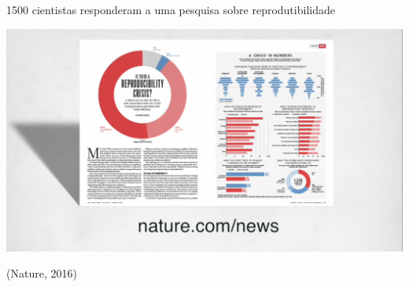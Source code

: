 \documentclass{beamer}
\begin{document}
\begin{frame}
  1500 cientistas responderam a uma pesquisa sobre reprodutibilidade

\includegraphics[width=\textwidth]{Intro/reprod-nature3}

  \vfill
  \begin{center}
    (Nature, 2016)
  \end{center}
\end{frame}
\end{document}
